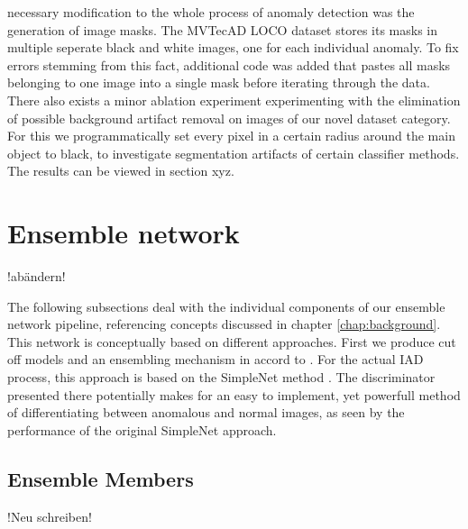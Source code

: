 necessary modification to the whole process of anomaly detection was the generation of image masks. The MVTecAD LOCO dataset stores its 
masks in multiple seperate black and white images, one for each individual anomaly. To fix errors stemming from this fact, additional 
code was added that pastes all masks belonging to one image into a single mask before iterating through the data. 
There also exists a minor ablation experiment experimenting with the elimination 
of possible background artifact removal on images of our novel dataset category. For this we programmatically set every pixel in a certain radius around the main object to black, to investigate 
segmentation artifacts of certain classifier methods. The results can be viewed in section xyz.




\section{Ensemble network}
\label{sec:ourensemblenetwork}
!abändern!

The following subsections deal with the individual components of our ensemble network pipeline, referencing concepts discussed in chapter \ref{chap:background}. This network is conceptually based on 
different approaches. First we produce cut off models and an ensembling mechanism in accord to \cite{EnsembleHeller2023}. For the actual IAD process, this approach is based on the SimpleNet method \cite{liu2023simplenet}. 
The discriminator presented there potentially makes for an easy to implement, yet powerfull method of differentiating between anomalous and normal images, as seen by the performance of the original 
SimpleNet approach. 


\subsection{Ensemble Members}
\label{sec:ensemblecandidates}

!Neu schreiben!

